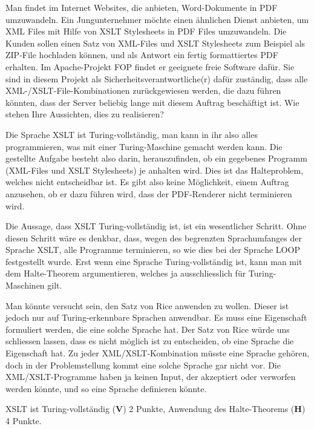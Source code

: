 Man findet im Internet Websites, die anbieten, Word-Dokumente in PDF
umzuwandeln.
Ein Jungunternehmer möchte einen ähnlichen Dienst anbieten, um XML Files
mit Hilfe von XSLT Stylesheets in PDF Files umzuwandeln.
Die Kunden sollen einen Satz von XML-Files und XSLT Stylesheets zum
Beispiel als ZIP-File hochladen können, und als Antwort ein fertig
formattiertes PDF erhalten.
Im Apache-Projekt FOP findet er geeignete freie Software dafür.
Sie sind in diesem Projekt als Sicherheitsverantwortliche(r) dafür zuständig,
dass alle XML-/XSLT-File-Kombinationen zurückgewiesen werden, die dazu führen
könnten, dass der Server beliebig lange mit diesem Auftrag beschäftigt ist.
Wie stehen Ihre Aussichten, dies zu realisieren?


\begin{loesung}
Die Sprache XSLT ist Turing-vollständig, man kann in ihr also alles
programmieren, was mit einer Turing-Maschine gemacht werden kann.
Die gestellte Aufgabe besteht also darin, herauszufinden, ob ein
gegebenes Programm (XML-Files und XSLT Stylesheets) je anhalten wird.
Dies ist das Halteproblem, welches nicht entscheidbar ist.
Es gibt also keine Möglichkeit, einem Auftrag anzusehen, ob er dazu
führen wird, dass der PDF-Renderer nicht terminieren wird.
\end{loesung}

\begin{diskussion}
Die Aussage, dass XSLT Turing-vollständig ist, ist ein wesentlicher Schritt.
Ohne diesen Schritt wäre es denkbar, dass, wegen des begrenzten Sprachumfanges
der Sprache XSLT, alle Programme terminieren, so wie dies bei der Sprache LOOP
festgestellt wurde.
Erst wenn eine Sprache Turing-vollständig ist, kann man mit dem Halte-Theorem
argumentieren, welches ja ausschliesslich für Turing-Maschinen gilt.

Man könnte versucht sein, den Satz von Rice anwenden zu wollen.
Dieser ist jedoch nur auf Turing-erkennbare Sprachen anwendbar.
Es muss eine Eigenschaft formuliert werden, die eine solche Sprache hat. 
Der Satz von Rice würde uns schliessen lassen, dass es nicht möglich ist
zu entscheiden, ob eine Sprache die Eigenschaft hat.
Zu jeder XML/XSLT-Kombination müsste eine Sprache gehören, doch
in der Problemstellung kommt eine solche Sprache gar nicht vor.
Die XML/XSLT-Programme haben ja keinen Input, der akzeptiert oder
verworfen werden könnte, und so eine Sprache definieren könnte.
\end{diskussion}

\begin{bewertung}
XSLT ist Turing-vollständig ({\bf V}) 2 Punkte,
Anwendung des Halte-Theorems ({\bf H}) 4 Punkte.
\end{bewertung}
